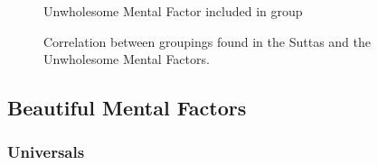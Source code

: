 \begin{figure}[h]
\begin{center}
\tm\hspace{2mm} Unwholesome Mental Factor included in group
\end{center}

\caption{Correlation between groupings found in the Suttas and the Unwholesome Mental Factors.}
\end{figure}

\subsection*{Beautiful Mental Factors}

\subsubsection*{Universals}

